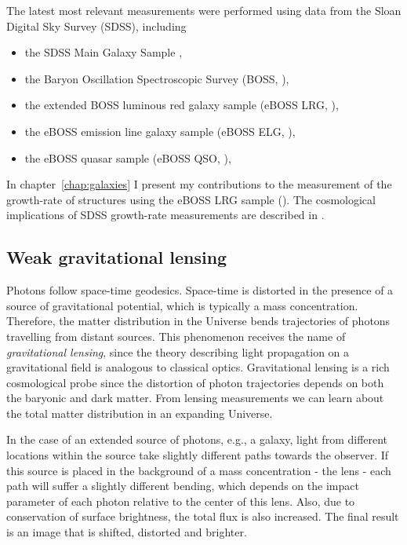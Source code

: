     The latest most relevant measurements were performed using data from 
    the Sloan Digital Sky Survey (SDSS), including 
    \begin{itemize} 
        \item the SDSS Main Galaxy Sample \cite{howlettClusteringSDSSMain2015},
        \item the Baryon Oscillation Spectroscopic Survey (BOSS, \cite{alamClusteringGalaxiesCompleted2017}), 
        \item the extended BOSS luminous red galaxy sample (eBOSS LRG, \cite{bautistaCompletedSDSSIVExtended2021, gil-marinCompletedSDSSIVExtended2020}), 
        \item the eBOSS emission line galaxy sample (eBOSS ELG, \cite{tamoneCompletedSDSSIVExtended2020, demattiaCompletedSDSSIVExtended2021}),
        \item the eBOSS quasar sample (eBOSS QSO, \cite{houCompletedSDSSIVExtended2021, neveuxCompletedSDSSIVExtended2020}),
    \end{itemize}

    In chapter~\ref{chap:galaxies} I present my contributions to the measurement 
    of the growth-rate of structures using the eBOSS LRG sample 
    (\cite{bautistaCompletedSDSSIVExtended2021}).
    The cosmological implications of SDSS growth-rate measurements are described 
    in \cite{alamCompletedSDSSIVExtended2021}. 

    \subsection{Weak gravitational lensing}
    \label{intro:probes:wl}

    Photons follow space-time geodesics. Space-time is distorted in the presence 
    of a source of gravitational potential, which is typically a mass concentration. 
    Therefore, the matter distribution in the Universe bends trajectories of photons 
    travelling from distant sources.  
    This phenomenon receives the name of \emph{gravitational lensing}, since the 
    theory describing light propagation on a gravitational field is analogous to classical optics.  
    Gravitational lensing is a rich cosmological probe since the distortion of photon trajectories
    depends on both the baryonic and dark matter. From lensing measurements we can learn 
    about the total matter distribution in an expanding Universe. 
    
    In the case of an extended source of photons, e.g., a galaxy, light from different 
    locations within the source take slightly different paths towards the observer. 
    If this source is placed in the background of a mass concentration - the lens - each 
    path will suffer a slightly different bending, which depends on the impact parameter 
    of each photon relative to the center of this lens. 
    Also, due to conservation of surface brightness, the total flux is also increased. 
    The final result is an image that is shifted, distorted and brighter. 

